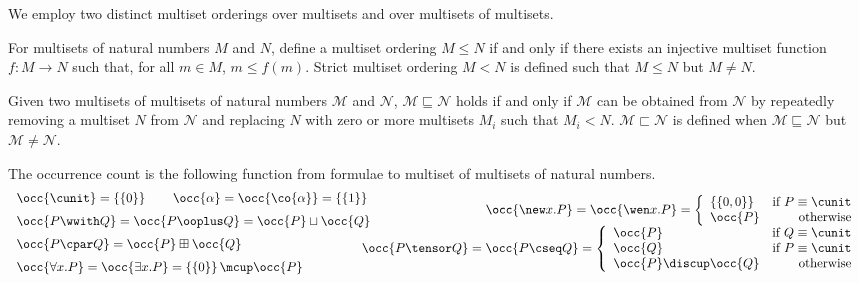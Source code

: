 \documentclass[UKenglish,acmsmall,authorversion]{acmart}
\theoremstyle{plain}
\begin{document}
{We employ two distinct multiset orderings over multisets and over multisets of multisets.
\begin{definition}
For multisets of natural numbers $M$ and $N$, define a multiset ordering $M \leq N$ if and only if there exists an injective multiset function $f \colon M \rightarrow N$ such that, for all $m \in M$, $m \leq f(m)$. Strict multiset ordering $M < N$ is defined such that $M \leq N$ but $M \not= N$.
\end{definition}

\begin{definition}
Given two multisets of multisets of natural numbers $\mathcal{M}$ and $\mathcal{N}$, $\mathcal{M} \sqsubseteq \mathcal{N}$ holds if and only if $\mathcal{M}$ can be obtained from $\mathcal{N}$ by repeatedly removing a multiset $N$ from $\mathcal{N}$ and replacing $N$ with zero or more multisets $M_i$ such that $M_i < N$. $\mathcal{M} \sqsubset \mathcal{N}$ is defined when $\mathcal{M} \sqsubseteq \mathcal{N}$ but $\mathcal{M} \not= \mathcal{N}$.
\end{definition}

\begin{definition}
The occurrence count is the following function from formulae to multiset of multisets of natural numbers.
\begin{gather*}
\begin{array}{l}
\occ{\cunit} = \left\{\left\{ 0 \right\}\right\}
\qquad
\occ{\alpha} = \occ{\co{\alpha}} = \left\{\left\{ 1 \right\}\right\}
\\[6pt]
\occ{P \wwith Q} = \occ{P \ooplus Q} = \occ{P} \sqcup \occ{Q}
\\[6pt]
\occ{P \cpar Q} = \occ{P} \boxplus \occ{Q}
\\[6pt]
\occ{ \forall x. P } = \occ{ \exists x. P } = \left\{\left\{ 0 \right\}\right\} \mcup \occ{ P }
\end{array}
\!\!\!\!\!\!\!\!\!\!
\begin{array}{r}
\occ{ \new x. P } = \occ{ \wen x. P } = 
\left\{
\begin{array}{lr}
\left\{\left\{ 0, 0 \right\}\right\} & \mbox{if $P \equiv \cunit$} \\
\occ{P} & \mbox{otherwise}
\end{array}
\right.
\\[6pt]
\occ{P \tensor Q} = \occ{P \cseq Q} = 
\left\{
\begin{array}{lr}
\occ{P} & \mbox{if $Q \equiv \cunit$} \\
\occ{Q} & \mbox{if $P \equiv \cunit$} \\
\occ{P} \discup \occ{Q} & \mbox{otherwise}
\end{array}
\right.
\end{array}
\end{gather*}
\end{definition}

}
\end{document}
